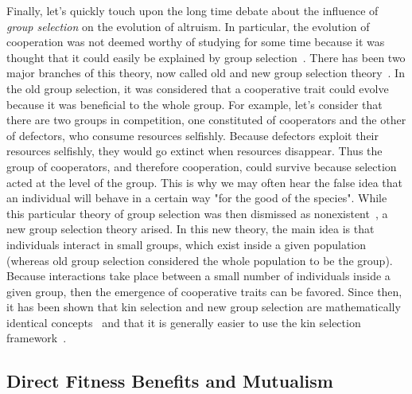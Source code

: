     Finally, let's quickly touch upon the long time debate about the influence of \emph{group selection} on the evolution of altruism. In particular, the evolution of cooperation was not deemed worthy of studying for some time because it was thought that it could easily be explained by group selection~\parencite{Axelrod1981}. There has been two major branches of this theory, now called old and new group selection theory~\parencite{West2007a}. In the old group selection, it was considered that a cooperative trait could evolve because it was beneficial to the whole group. For example, let's consider that there are two groups in competition, one constituted of cooperators and the other of defectors, who consume resources selfishly. Because defectors exploit their resources selfishly, they would go extinct when resources disappear. Thus the group of cooperators, and therefore cooperation, could survive because selection acted at the level of the group. This is why we may often hear the false idea that an individual will behave in a certain way "for the good of the species". While this particular theory of group selection was then dismissed as nonexistent~\parencite{MaynardSmith1976}, a new group selection theory arised. In this new theory, the main idea is that individuals interact in small groups, which exist inside a given population (whereas old group selection considered the whole population to be the group). Because interactions take place between a small number of individuals inside a given group, then the emergence of cooperative traits can be favored. Since then, it has been shown that kin selection and new group selection are mathematically identical concepts~\parencite{Hamilton1975, VanBaalen1998, Gardner2007} and that it is generally easier to use the kin selection framework~\parencite{West2007a}.


  \subsection{Direct Fitness Benefits and Mutualism}


